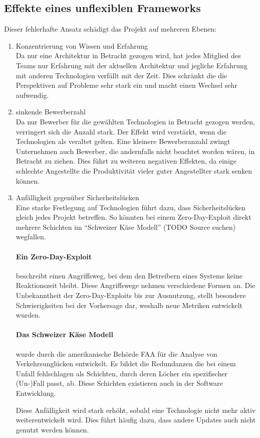 \documentclass[./einleitung.tex]{subfiles}
\begin{document}
\subsection{Effekte eines unflexiblen Frameworks}\label{subsec:effekte-eines-unflexiblen-frameworks}
Dieser fehlerhafte Ansatz schädigt das Projekt auf mehreren Ebenen:
\begin{enumerate}
\item Konzentrierung von Wissen und Erfahrung  \\
Da nur eine Architektur in Betracht gezogen wird, hat jedes Mitglied des Teams nur Erfahrung mit der aktuellen Architektur und jegliche Erfahrung mit anderen Technologien verfällt mit der Zeit. Dies schränkt die die Perspektiven auf Probleme sehr stark ein und macht einen Wechsel sehr aufwendig.
\item sinkende Bewerberzahl \\
Da nur Bewerber für die gewählten Technologien in Betracht gezogen werden, verringert sich die Anzahl stark.
Der Effekt wird verstärkt, wenn die Technologien als veraltet gelten.
Eine kleinere Bewerberanzahl zwingt Unternehmen auch Bewerber, die andernfalls nicht beachtet worden wären, in Betracht zu ziehen.
Dies führt zu weiteren negativen Effekten, da einige schlechte Angestellte die Produktivität vieler guter Angestellter stark senken können.
\item Anfälligkeit gegenüber Sicherheitslücken \\
Eine starke Festlegung auf Technologien führt dazu, dass Sicherheitslücken gleich jedes Projekt betreffen.
So könnten bei einem Zero-Day-Exploit direkt mehrere Schichten im ``Schweizer Käse Modell'' (TODO Source suchen) wegfallen.
\begin{center}
    \paragraph{Ein Zero-Day-Exploit} beschreibt einen Angriffsweg, bei dem den Betreibern eines Systems keine Reaktionszeit bleibt. \cite{ibmZeroDay}
    Diese Angriffswege nehmen verschiedene Formen an.
    Die Unbekanntheit der Zero-Day-Exploits bis zur Ausnutzung, stellt besondere Schwierigkeiten bei der Vorhersage dar, weshalb neue Metriken entwickelt wurden. \cite{wang2013k}
\end{center}
\begin{center}
    \paragraph{Das Schweizer Käse Modell} wurde durch die amerikanische Behörde FAA für die Analyse von Verkehrsunglücken entwickelt.
    Es bildet die Redundanzen die bei einem Unfall fehlschlagen als Schichten, durch deren Löcher ein spezifischer (Un-)Fall passt, ab.
    Diese Schichten existieren auch in der Software Entwicklung.\cite{bergeon2009swiss} %
\end{center}
Diese Anfälligkeit wird stark erhöht, sobald eine Technologie nicht mehr aktiv weiterentwickelt wird.
Dies führt häufig dazu, dass andere Updates auch nicht genutzt werden können.
\end{enumerate}
\end{document}
